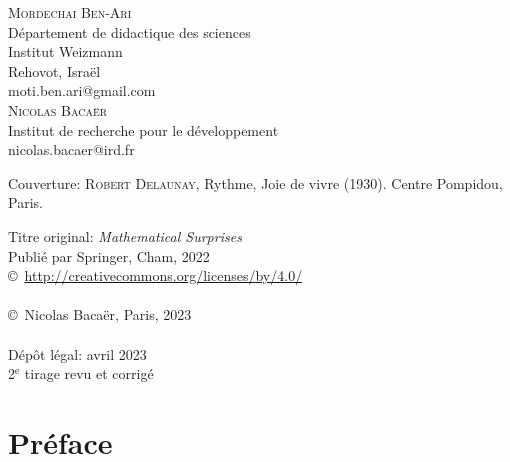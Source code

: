 



\noindent \textsc{Mordechai Ben-Ari}\\
Département de didactique des sciences\\
Institut Weizmann \\
Rehovot, Israël\\
moti.ben.ari@gmail.com\\


\noindent  \textsc{Nicolas Baca\"er}\\
{Institut de recherche pour le d\'eveloppement}\\
nicolas.bacaer@ird.fr\\

\vspace{3cm}

\noindent Couverture: \textsc{Robert Delaunay}, Rythme, Joie de vivre (1930). Centre Pompidou, Paris. 

\vspace{3cm}

\noindent Titre original: \emph{Mathematical Surprises}\\
Publié par Springer, Cham, 2022\\
\noindent \copyright\ \url{http://creativecommons.org/licenses/by/4.0/}\\

\\
\noindent \copyright\ {Nicolas Bacaër, Paris, 2023} \\
 \\
{Dépôt légal: avril 2023}\\
2$^\text{e}$ tirage revu et corrigé\\

\rhead[\fancyplain{}{}]%
{\fancyplain{}{\thepage}}
\cfoot{}
\pagestyle{fancyplain}



\chapter*{Préface}

\vspace{-0.4cm}

